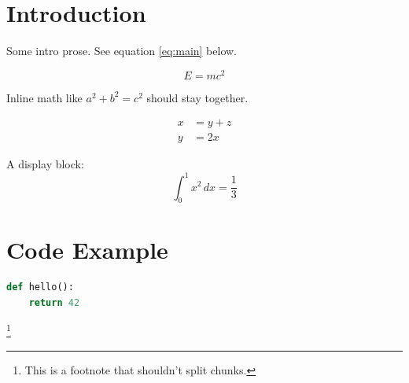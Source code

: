 \documentclass{article}
\begin{document}
\section{Introduction}

Some intro prose. See equation \ref{eq:main} below.

\begin{equation}
E = mc^2 \label{eq:main}
\end{equation}

Inline math like $a^2 + b^2 = c^2$ should stay together.

\begin{align}
x &= y + z \\
y &= 2x
\end{align}

A display block: \[ \int_0^1 x^2 \, dx = \frac{1}{3} \]

\section{Code Example}

\begin{lstlisting}[language=Python]
def hello():
    return 42
\end{lstlisting}

\footnote{This is a footnote that shouldn't split chunks.}



\end{document}
